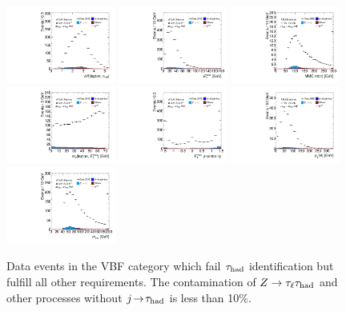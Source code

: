 \begin{figure}[tp]
  \includegraphics[width=0.32\textwidth]{figures/antitaus/taulep-dR}
  \includegraphics[width=0.32\textwidth]{figures/antitaus/met-pt-hi}
  \includegraphics[width=0.32\textwidth]{figures/antitaus/mMMC}
  \includegraphics[width=0.32\textwidth]{figures/antitaus/mT}
  \includegraphics[width=0.32\textwidth]{figures/antitaus/met-phi-centrality}
  \includegraphics[width=0.32\textwidth]{figures/antitaus/H-pt-hi}
  \includegraphics[width=0.32\textwidth]{figures/antitaus/mvis}
  \caption{Data events in the VBF category which fail $\tau_\text{had}$ identification but fulfill all other requirements. The contamination of $Z\rightarrow\tau_\ell\tau_\text{had}$ and other processes without $j\!\rightarrow\!\tau_\text{had}$ is less than 10\%.}
  \label{fig:backgrounds-antitaus-taus}
\end{figure}


